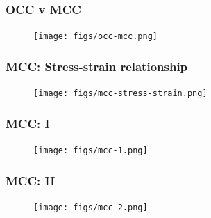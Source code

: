 \documentclass[notes]{beamer}
\begin{document}


\begin{frame}
\frametitle{OCC v MCC}
	\begin{figure}
	\texttt{[image: figs/occ-mcc.png]}
\end{figure}
\end{frame}

\begin{frame}
\frametitle{MCC: Stress-strain relationship}
\begin{figure}
	\texttt{[image: figs/mcc-stress-strain.png]}
\end{figure}
\end{frame}

\begin{frame}
\frametitle{MCC: I}
\begin{figure}
	\texttt{[image: figs/mcc-1.png]}
\end{figure}
\end{frame}

\begin{frame}
\frametitle{MCC: II}
\begin{figure}
	\texttt{[image: figs/mcc-2.png]}
\end{figure}
\end{frame}
\end{document}
